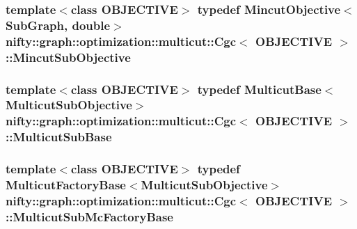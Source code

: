 \subsubsection[{Mincut\+Sub\+Objective}]{\setlength{\rightskip}{0pt plus 5cm}template$<$class O\+B\+J\+E\+C\+T\+I\+V\+E$>$ typedef {\bf Mincut\+Objective}$<${\bf Sub\+Graph}, double$>$ {\bf nifty\+::graph\+::optimization\+::multicut\+::\+Cgc}$<$ O\+B\+J\+E\+C\+T\+I\+V\+E $>$\+::{\bf Mincut\+Sub\+Objective}}\label{classnifty_1_1graph_1_1optimization_1_1multicut_1_1Cgc_a69d467869906adbb17d20768c6e9d6a5}
\hypertarget{classnifty_1_1graph_1_1optimization_1_1multicut_1_1Cgc_a9bd82569e6729554ef0a07ad57f2bd94}{}
\subsubsection[{Multicut\+Sub\+Base}]{\setlength{\rightskip}{0pt plus 5cm}template$<$class O\+B\+J\+E\+C\+T\+I\+V\+E$>$ typedef {\bf Multicut\+Base}$<${\bf Multicut\+Sub\+Objective}$>$ {\bf nifty\+::graph\+::optimization\+::multicut\+::\+Cgc}$<$ O\+B\+J\+E\+C\+T\+I\+V\+E $>$\+::{\bf Multicut\+Sub\+Base}}\label{classnifty_1_1graph_1_1optimization_1_1multicut_1_1Cgc_a9bd82569e6729554ef0a07ad57f2bd94}
\hypertarget{classnifty_1_1graph_1_1optimization_1_1multicut_1_1Cgc_a6d51da2980311e5646e75fc433b4f8fb}{}
\subsubsection[{Multicut\+Sub\+Mc\+Factory\+Base}]{\setlength{\rightskip}{0pt plus 5cm}template$<$class O\+B\+J\+E\+C\+T\+I\+V\+E$>$ typedef {\bf Multicut\+Factory\+Base}$<${\bf Multicut\+Sub\+Objective}$>$ {\bf nifty\+::graph\+::optimization\+::multicut\+::\+Cgc}$<$ O\+B\+J\+E\+C\+T\+I\+V\+E $>$\+::{\bf Multicut\+Sub\+Mc\+Factory\+Base}}\label{classnifty_1_1graph_1_1optimization_1_1multicut_1_1Cgc_a6d51da2980311e5646e75fc433b4f8fb}
\hypertarget{classnifty_1_1graph_1_1optimization_1_1multicut_1_1Cgc_a9f45b9b069eeb695822654e30b29f3f2}{}
